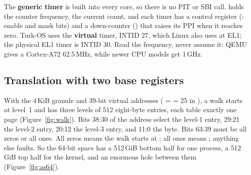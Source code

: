 \documentclass[11pt,a4paper]{article}
\begin{document}
The \textbf{generic timer} is built into every core, so there is no PIT or SBI call.  holds the
counter frequency,  the current count, and each timer has a control register (:
enable and mask bits) and a down-counter () that raises its PPI when it reaches zero. Turk-OS uses
the \textbf{virtual} timer, INTID 27, which Linux also uses at EL1; the physical EL1 timer is INTID 30. Read the
frequency, never assume it: QEMU gives a Cortex-A72 62.5\,MHz, while newer CPU models get 1\,GHz.

\subsection{Translation with two base registers}

With the 4\,KiB granule and 39-bit virtual addresses ( =  = 25 in ), a walk starts
at level~1 and has three levels of 512 eight-byte entries, each table exactly one page (Figure~\ref{fig:walk}). Bits
38:30 of the address select the level-1 entry, 29:21 the level-2 entry, 20:12 the level-3 entry, and 11:0 the byte.
Bits 63:39 must be all zeros or all ones. All zeros means the walk starts at ; all ones means
; anything else faults. So the 64-bit space has a 512\,GiB bottom half for one process, a 512\,GiB
top half for the kernel, and an enormous hole between them (Figure~\ref{fig:as64}).
\end{document}
